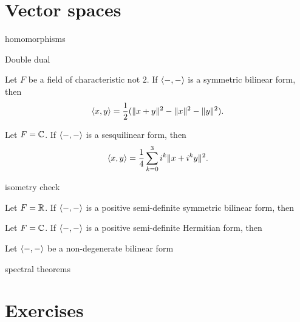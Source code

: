 \documentclass{../../large}
\begin{document}
\begin{prb}
\end{prb}







\section{Vector spaces}

\begin{prb}[Fields]
homomorphisms
\end{prb}

\begin{prb}
Double dual
\end{prb}



\begin{prb}
\begin{parts}
\item Let $F$ be a field of characteristic not $2$. If $\langle-,-\rangle$ is a symmetric bilinear form, then
\[\langle x,y\rangle=\frac12(\|x+y\|^2-\|x\|^2-\|y\|^2).\]
\item Let $F=\mathbb{C}$. If $\langle-,-\rangle$ is a sesquilinear form, then
\[\langle x,y\rangle=\frac14\sum_{k=0}^3i^k\|x+i^ky\|^2.\]
\item isometry check
\end{parts}
\end{prb}

\begin{prb}
\begin{parts}
\item Let $F=\mathbb{R}$. If $\langle-,-\rangle$ is a positive semi-definite symmetric bilinear form, then
\item Let $F=\mathbb{C}$. If $\langle-,-\rangle$ is a positive semi-definite Hermitian form, then
\end{parts}
\end{prb}

\begin{prb}
Let $\langle-,-\rangle$ be a non-degenerate bilinear form
\end{prb}


\begin{prb}
\end{prb}


spectral theorems




\section*{Exercises}
\end{document}
